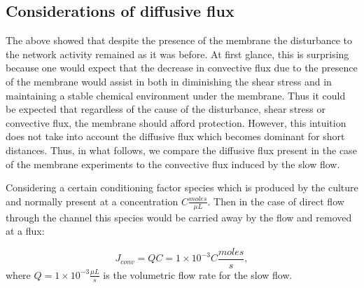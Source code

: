         \subsection{Considerations of diffusive flux}
        The above showed that despite the presence of the membrane the disturbance to the network activity remained as it was before. At first glance, this is surprising because one would expect that the decrease in convective flux due to the presence of the membrane would assist in both in diminishing the shear stress and in maintaining a stable chemical environment under the membrane. Thus it could be expected that regardless of the cause of the disturbance, shear stress or convective flux, the membrane should afford protection. However, this intuition does not take into account the diffusive flux which becomes dominant for short distances. Thus, in what follows, we compare the diffusive flux present in the case of the membrane experiments to the convective flux induced by the slow flow.

        Considering a certain conditioning factor species which is produced by the culture and normally present at a concentration \(C \frac{moles}{\mu L}\). Then in the case of direct flow through the channel this species would be carried away by the flow and removed at a flux:

        \[J_{conv}=QC=1\times 10^{-3}C \frac{moles}{s},\] where \(Q=1\times 10^{-3}\frac{\mu L}{s}\) is the volumetric flow rate for the slow flow.

